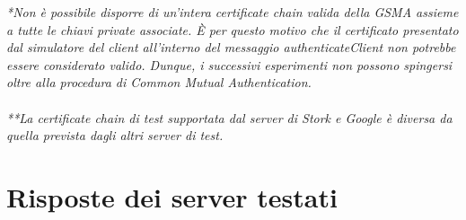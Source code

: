 \documentclass[10pt, oneside]{book}
\begin{document}
\noindent \textit{*Non è possibile disporre di un'intera certificate chain valida della GSMA assieme a tutte le chiavi private associate. È per questo motivo che il certificato presentato dal simulatore del client all'interno del messaggio authenticateClient non potrebbe essere considerato valido. Dunque, i successivi esperimenti non possono spingersi oltre alla procedura di Common Mutual Authentication.}\\ \\
\textit{**La certificate chain di test supportata dal server di Stork e Google è diversa da quella prevista dagli altri server di test.}

\section{Risposte dei server testati}
\end{document}
